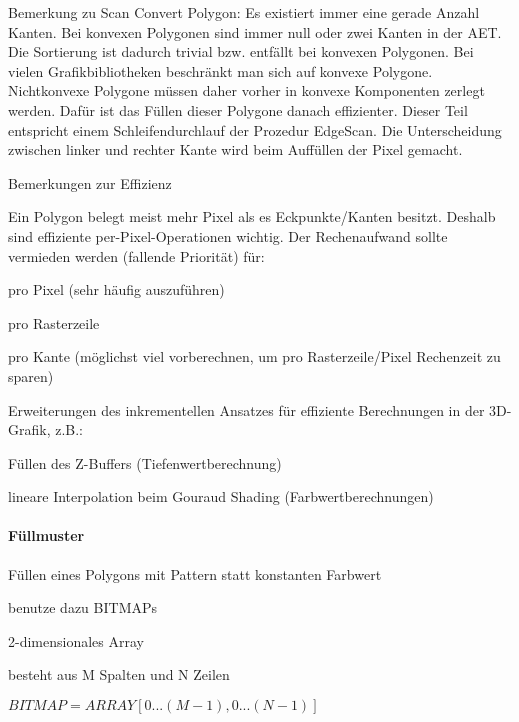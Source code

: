 \documentclass[landscape]{article}
\begin{document}
\begin{multicols}{3}
\begin{itemize*}
\begin{itemize*}
    \end{itemize*}
    \item Bemerkung zu Scan Convert Polygon: Es existiert immer eine gerade Anzahl Kanten. Bei konvexen Polygonen sind immer null oder zwei Kanten in der AET. Die Sortierung ist dadurch trivial bzw. entfällt bei konvexen Polygonen. Bei vielen Grafikbibliotheken beschränkt man sich auf konvexe Polygone. Nichtkonvexe Polygone müssen daher vorher in konvexe Komponenten zerlegt werden. Dafür ist das Füllen dieser Polygone danach effizienter. Dieser Teil entspricht einem Schleifendurchlauf der Prozedur EdgeScan. Die Unterscheidung zwischen linker und rechter Kante wird beim Auffüllen der Pixel gemacht.
    \item Bemerkungen zur Effizienz
    \begin{itemize*}
      \item Ein Polygon belegt meist mehr Pixel als es Eckpunkte/Kanten besitzt. Deshalb sind effiziente per-Pixel-Operationen wichtig. Der Rechenaufwand sollte vermieden werden (fallende Priorität) für:
      \item  pro Pixel (sehr häufig auszuführen)
      \item  pro Rasterzeile
      \item  pro Kante (möglichst viel vorberechnen, um pro Rasterzeile/Pixel Rechenzeit zu sparen)
    \end{itemize*}
      \item Erweiterungen des inkrementellen Ansatzes für effiziente Berechnungen in der 3D-Grafik, z.B.:
      \item Füllen des Z-Buffers (Tiefenwertberechnung)
      \item lineare Interpolation beim Gouraud Shading (Farbwertberechnungen)
  \end{itemize*}
  
  \paragraph{Füllmuster}
  \begin{itemize*}
    \item Füllen eines Polygons mit Pattern statt konstanten Farbwert
    \item benutze dazu BITMAPs
    \item 2-dimensionales Array
    \item besteht aus M Spalten und N Zeilen
    \item $BITMAP = ARRAY [0... (M-1), 0...(N-1)]$
  \end{itemize*}
  

\end{multicols}
\end{document}
